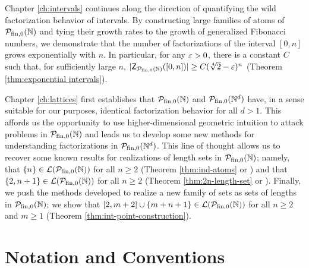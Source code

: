 Chapter \ref{ch:intervals} continues along the direction of quantifying the wild factorization behavior of intervals.
By constructing large families of atoms of ${\mathcal{P}_{\textrm{fin},0}(\mathbb{N})}$ and tying their growth rates to the growth of generalized Fibonacci numbers, we demonstrate that the number of factorizations of the interval $[0,n]$ grows exponentially with $n$.
In particular, for any $\varepsilon>0$, there is a constant $C$ such that, for sufficiently large $n$, $|\mathsf{Z}_{\mathcal{P}_{\textrm{fin},0}(\mathbb{N})}([0,n])| \ge C(\sqrt[4]{2}-\varepsilon)^n$ (Theorem \ref{thm:exponential intervals}).

Chapter \ref{ch:lattices} first establishes that ${\mathcal{P}_{\textrm{fin},0}(\mathbb{N})}$ and $\mathcal{P}_{\textrm{fin}, 0}(\mathbb{N}^d)$ have, in a sense suitable for our purposes, identical factorization behavior for all $d>1$.
This affords us the opportunity to use higher-dimensional geometric intuition to attack problems in ${\mathcal{P}_{\textrm{fin},0}(\mathbb{N})}$ and leads us to develop some new methods for understanding factorizations in $\mathcal{P}_{\textrm{fin}, 0}(\mathbb{N}^d)$.
This line of thought allows us to recover some known results for realizations of length sets in ${\mathcal{P}_{\textrm{fin},0}(\mathbb{N})}$; namely, that $\{n\} \in\mathcal{L}({\mathcal{P}_{\textrm{fin},0}(\mathbb{N})})$ for all $n\ge 2$ (Theorem \ref{thm:ind-atoms} or  \cite[Proposition 4.9]{fan-tringali18}) and that $\{2,n+1\}\in \mathcal{L}({\mathcal{P}_{\textrm{fin},0}(\mathbb{N})})$ for all $n\ge 2$ (Theorem \ref{thm:2n-length-set} or \cite[Proposition 4.10]{fan-tringali18}).
Finally, we push the methods developed to realize a new family of sets as sets of lengths in ${\mathcal{P}_{\textrm{fin},0}(\mathbb{N})}$; we show that $[2,m+2]\cup\{m+n+1\}\in \mathcal{L}({\mathcal{P}_{\textrm{fin},0}(\mathbb{N})})$ for all $n\ge 2$ and $m\ge 1$ (Theorem \ref{thm:int-point-construction}).

\section{Notation and Conventions} \label{subsec:generalities}

